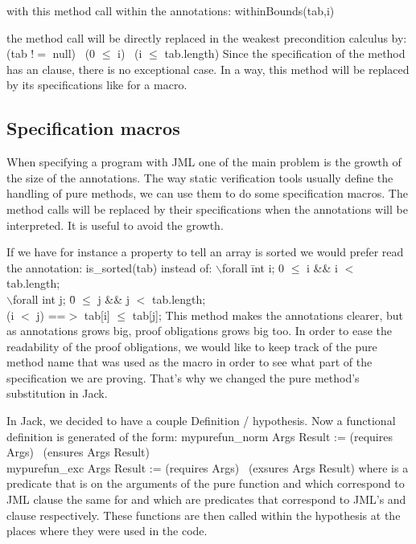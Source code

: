 with this method call within the annotations: 
\btab
withinBounds(tab,i)
\etab

the method call will be directly replaced in the weakest precondition calculus by:
\btab
(tab $!=$ null) \rarrow \ (0 $\le$ i) \conj \ (i $\le$ tab.length)
\etab
Since the specification
of the method has an  clause, there is no exceptional case.
In a way, this method will be replaced by its specifications like for a macro.



\subsection{Specification macros}


When specifying a program with JML one of the main problem is the 
growth of the size of the annotations. 
The way static verification tools usually define the handling 
of pure methods, we can use them to do some specification macros.
The method calls will be replaced by their specifications when the 
annotations will be interpreted. It is useful to avoid the growth.

If we have for instance a property to tell an array is sorted we would 
prefer read the annotation:
\btab
is\_sorted(tab)
\etab
instead of:
\btab
 $\backslash$forall \=int i; 0 $\le$ i \&\& i $<$ tab.length;\+\\ 
 $\backslash$forall int j; \=0 $\le$ j \&\& j $<$ tab.length; \+\\(i $<$ j) ==$>$ tab[i] $\le$ tab[j];
\etab
This method makes the annotations clearer, but as annotations 
grows big, proof obligations grows big too. In order to ease the readability 
of the proof obligations, we would like to keep track of the pure method name
that was used as the macro in order to see what part of the specification we 
are proving. That's why we changed the pure method's substitution in Jack.

In Jack, we decided to have a couple Definition / hypothesis.
Now a functional definition is generated of the form:
\btab
mypurefun\_norm  Args Result := (requires Args) \rarrow \ (ensures Args Result)\\
mypurefun\_exc  Args Result := (requires Args) \rarrow \ (exsures Args Result)
\etab
where  is a predicate that is on the arguments of the pure function and 
which correspond to JML  clause the same for  and  
which are predicates that correspond to JML's  and  clause respectively.
These functions are then called within the hypothesis at the places where they were used in the code. 

